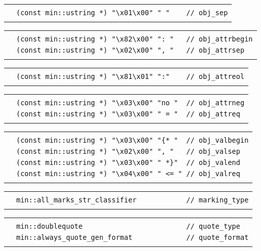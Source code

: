 \documentclass[12pt]{article}
\newenvironment{indpar}[1][0.3in]%
	{\begin{list}{}%
		     {\setlength{\itemsep}{0in}%
		      \setlength{\topsep}{0in}%
		      \setlength{\parsep}{1ex}%
		      \setlength{\labelwidth}{#1}%
		      \setlength{\leftmargin}{#1}%
		      \addtolength{\leftmargin}{\labelsep}}%
	 \item}%
	{\end{list}}
\newlength{\ARGBREAKLENGTH}
\newcommand{\ARGBREAK}[1][\ARGBREAKLENGTH]{\\&\hspace*{#1}}
\begin{document}
\begin{indpar}[1em]
\vspace{-4ex}\begin{tabular}{r@{}l}\hspace*{0.1in}\ARGBREAK
\verb|(const min::ustring *) "\x01\x00" " "    // obj_sep|\ARGBREAK
\end{tabular}

\vspace{-4ex}\begin{tabular}{r@{}l}\hspace*{0.1in}\ARGBREAK
\verb|(const min::ustring *) "\x82\x00" ": "   // obj_attrbegin|\ARGBREAK
\verb|(const min::ustring *) "\x02\x00" ", "   // obj_attrsep|\ARGBREAK
\end{tabular}

\vspace{-4ex}\begin{tabular}{r@{}l}\hspace*{0.1in}\ARGBREAK
\verb|(const min::ustring *) "\x81\x01" ":"    // obj_attreol|\ARGBREAK
\end{tabular}

\vspace{-4ex}\begin{tabular}{r@{}l}\hspace*{0.1in}\ARGBREAK
\verb|(const min::ustring *) "\x03\x00" "no "  // obj_attrneg|\ARGBREAK
\verb|(const min::ustring *) "\x03\x00" " = "  // obj_attreq|\ARGBREAK
\end{tabular}

\vspace{-4ex}\begin{tabular}{r@{}l}\hspace*{0.1in}\ARGBREAK
\verb|(const min::ustring *) "\x03\x00" "{* "  // obj_valbegin|\ARGBREAK
\verb|(const min::ustring *) "\x02\x00" ", "   // obj_valsep|\ARGBREAK
\verb|(const min::ustring *) "\x03\x00" " *}"  // obj_valend|\ARGBREAK
\verb|(const min::ustring *) "\x04\x00" " <= " // obj_valreq|\ARGBREAK
\end{tabular}

\vspace{-4ex}\begin{tabular}{r@{}l}\hspace*{0.1in}\ARGBREAK
\verb|min::all_marks_str_classifier            // marking_type|\ARGBREAK
\end{tabular}

\vspace{-4ex}\begin{tabular}{r@{}l}\hspace*{0.1in}\ARGBREAK
\verb|min::doublequote                         // quote_type|\ARGBREAK
\verb|min::always_quote_gen_format             // quote_format|\ARGBREAK
\end{tabular}


\end{indpar}
\end{document}

